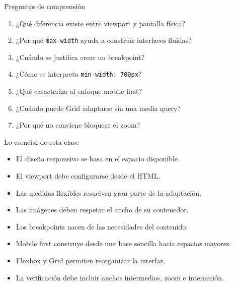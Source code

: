 \documentclass[aspectratio=169,11pt]{beamer}
\begin{document}
    \begin{frame}{Preguntas de comprensión}
        \begin{enumerate}
            \item ¿Qué diferencia existe entre viewport y pantalla física?
            \item ¿Por qué \texttt{max-width} ayuda a construir interfaces fluidas?
            \item ¿Cuándo se justifica crear un breakpoint?
            \item ¿Cómo se interpreta \texttt{min-width: 700px}?
            \item ¿Qué caracteriza al enfoque mobile first?
            \item ¿Cuándo puede Grid adaptarse sin una media query?
            \item ¿Por qué no conviene bloquear el zoom?
        \end{enumerate}
    \end{frame}

    \begin{frame}{Lo esencial de esta clase}
        \begin{itemize}
            \item El diseño responsivo se basa en el espacio disponible.
            \item El viewport debe configurarse desde el HTML.
            \item Las medidas flexibles resuelven gran parte de la adaptación.
            \item Las imágenes deben respetar el ancho de su contenedor.
            \item Los breakpoints nacen de las necesidades del contenido.
            \item Mobile first construye desde una base sencilla hacia espacios mayores.
            \item Flexbox y Grid permiten reorganizar la interfaz.
            \item La verificación debe incluir anchos intermedios, zoom e interacción.
        \end{itemize}

    \end{frame}
\end{document}
